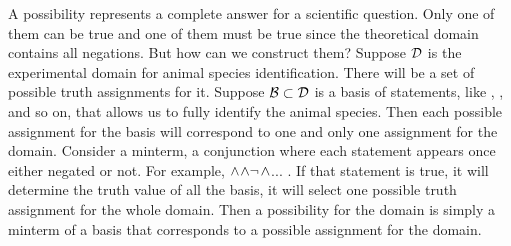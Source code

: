 \documentclass[11pt,letterpaper,fleqn]{memoir} %
\begin{document}
A possibility represents a complete answer for a scientific question. Only one of them can be true and one of them must be true since the theoretical domain contains all negations. But how can we construct them? Suppose $\mathcal{D}$ is the experimental domain for animal species identification. There will be a set of possible truth assignments for it. Suppose $\mathcal{B} \subset \mathcal{D}$ is a basis of statements, like , ,  and so on, that allows us to fully identify the animal species. Then each possible assignment for the basis will correspond to one and only one assignment for the domain. Consider a minterm, a conjunction where each statement appears once either negated or not. For example, $\wedge$$\wedge\neg$$\wedge$... . If that statement is true, it will determine the truth value of all the basis, it will select one possible truth assignment for the whole domain. Then a possibility for the domain is simply a minterm of a basis that corresponds to a possible assignment for the domain.
\end{document}
